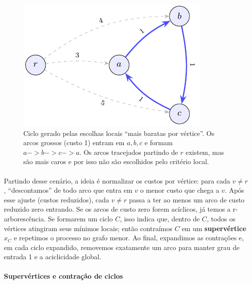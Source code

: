 \documentclass[12pt,a4paper]{article}
\def\emph#1{#1}%
\def\to{->}%
\begin{document}
\begin{figure}[H]
    \centering
    \includegraphics[width=0.9\linewidth]{figures/fig_chu_liu_cycle_micro.pdf}

    \caption{Ciclo gerado pelas escolhas locais “mais baratas por vértice”. Os arcos grossos (custo 1) entram em \(a,b,c\) e formam \(a\to b\to c\to a\). Os arcos tracejados partindo de \(r\) existem, mas são mais caros e por isso não são escolhidos pelo critério local.}
    \label{fig:chu-liu-cycle-micro}\end{figure}


\paragraph{}
Partindo desse cenário, a ideia é \emph{normalizar os custos por vértice}: para cada \(v\neq r\), “descontamos” de todo arco que entra em \(v\) o menor custo que chega a \(v\). Após esse ajuste (custos reduzidos), cada \(v\neq r\) passa a ter ao menos um arco de custo reduzido zero entrando. Se os arcos de custo zero forem acíclicos, já temos a r-arborescência. Se formarem um ciclo \(C\), isso indica que, dentro de \(C\), todos os vértices atingiram seus mínimos locais; então \emph{contraímos} \(C\) em um \textbf{supervértice} \(x_C\) e repetimos o processo no grafo menor. Ao final, \emph{expandimos} as contrações e, em cada ciclo expandido, removemos exatamente um arco para manter grau de entrada 1 e a aciclicidade global.

\paragraph{Supervértices e contração de ciclos}
\end{document}
